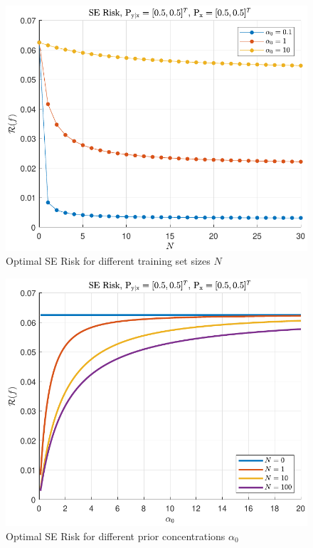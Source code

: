 \documentclass[12pt]{article}
\begin{document}
\begin{figure}
\centering
\includegraphics[scale=1.0]{Risk_SE_Dir_IO_N_leg_a0.pdf}
\caption{Optimal SE Risk for different training set sizes $N$}
\label{fig:Risk_SE_Dir_IO_N_leg_a0}
\end{figure}

\begin{figure}
\centering
\includegraphics[scale=1.0]{Risk_SE_Dir_IO_a0_leg_N.pdf}
\caption{Optimal SE Risk for different prior concentrations $\alpha_0$}
\label{fig:Risk_SE_Dir_IO_a0_leg_N}
\end{figure}
\end{document}
